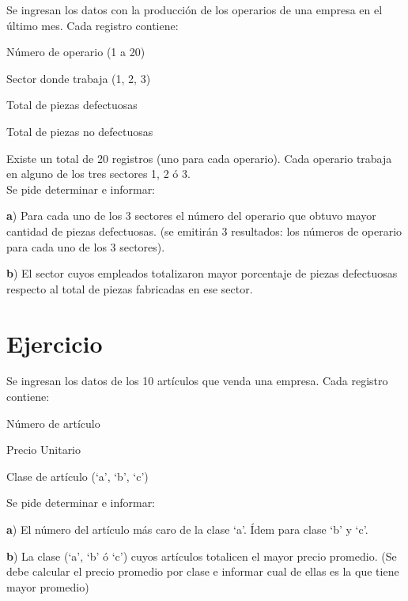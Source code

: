 \documentclass[12pt,a4paper,twoside]{article}
\begin{document}
\hspace*{1cm}Se ingresan los datos con la producción de los operarios de una empresa en el último mes. Cada registro contiene:
\begin{list}{•}{}
\item \textbf{}Número de operario (1 a 20)
\item \textbf{}Sector donde trabaja (1, 2, 3)
\item \textbf{}Total de piezas defectuosas
\item \textbf{}Total de piezas no defectuosas
\end{list}
Existe un total de 20 registros (uno para cada operario). Cada operario trabaja en alguno de los tres sectores 1, 2 ó 3.\\
Se pide determinar e informar: 
\begin{list}{•}{}
\item \textbf{a}) Para cada uno de los 3 sectores el número del operario que obtuvo mayor cantidad de piezas defectuosas. (se emitirán 3 resultados: los números de operario para cada uno de los 3 sectores). 
\item \textbf{b}) El sector cuyos empleados totalizaron mayor porcentaje de piezas defectuosas respecto al total de piezas fabricadas en ese sector. 
\end{list}

\newpage{\ }
\newpage

\section{Ejercicio }

\hspace*{1cm}Se ingresan los datos de los 10 artículos que venda una empresa. Cada registro contiene:
\begin{list}{•}{}
\item \textbf{}Número de artículo
\item \textbf{}Precio Unitario
\item \textbf{}Clase de artículo (‘a’, ‘b’, ‘c’)
\end{list}
Se pide determinar e informar: 
\begin{list}{•}{}
\item \textbf{a}) El número del artículo más caro de la clase ‘a’. Ídem para clase ‘b’ y ‘c’.
\item \textbf{b}) La clase (‘a’, ‘b’ ó ‘c’) cuyos artículos totalicen el mayor precio promedio. (Se debe calcular el precio promedio por clase e informar cual de ellas es la que tiene mayor promedio) 
\end{list}
\end{document}

